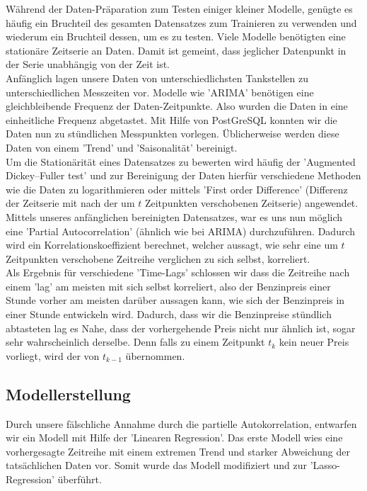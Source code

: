 \documentclass[
ngerman          %
,a4paper          %
,11pt
,pdftex
]{report}
\begin{document}
Während der Daten-Präparation zum Testen einiger kleiner Modelle, genügte es häufig ein Bruchteil des gesamten Datensatzes zum Trainieren zu verwenden und wiederum ein Bruchteil dessen, um es zu testen.
Viele Modelle benötigten eine stationäre Zeitserie an Daten.
Damit ist gemeint, dass jeglicher Datenpunkt in der Serie unabhängig von der Zeit ist.\\
Anfänglich lagen unsere Daten von unterschiedlichsten Tankstellen zu unterschiedlichen Messzeiten vor. Modelle wie 'ARIMA' benötigen eine gleichbleibende Frequenz der Daten-Zeitpunkte. Also wurden die Daten in eine einheitliche Frequenz abgetastet. Mit Hilfe von PostGreSQL konnten wir die Daten nun zu stündlichen Messpunkten vorlegen. 
Üblicherweise werden diese Daten von einem 'Trend' und 'Saisonalität' bereinigt.\\
Um die Stationärität eines Datensatzes zu bewerten wird häufig der 'Augmented Dickey–Fuller test' \cite{stationarity} und zur Bereinigung der Daten hierfür verschiedene Methoden wie die Daten zu logarithmieren oder mittels 'First order Difference' (Differenz der Zeitserie mit nach der um $t$ Zeitpunkten verschobenen Zeitserie) angewendet. 
Mittels unseres anfänglichen bereinigten Datensatzes, war es uns nun möglich eine 'Partial Autocorrelation'\cite{pacf} (ähnlich wie bei ARIMA) durchzuführen. Dadurch wird ein Korrelationskoeffizient berechnet, welcher aussagt, wie sehr eine um $t$ Zeitpunkten verschobene Zeitreihe verglichen zu sich selbst, korreliert.\\
Als Ergebnis für verschiedene 'Time-Lags' schlossen wir dass die Zeitreihe nach einem 'lag' am meisten mit sich selbst korreliert, also der Benzinpreis einer Stunde vorher am meisten darüber aussagen kann, wie sich der Benzinpreis in einer Stunde entwickeln wird.
Dadurch, dass wir die Benzinpreise stündlich abtasteten lag es Nahe, dass der vorhergehende Preis nicht nur ähnlich ist, sogar sehr wahrscheinlich derselbe. Denn falls zu einem Zeitpunkt $t_k$ kein neuer Preis vorliegt, wird der von $t_{k-1}$ übernommen.

\subsection{Modellerstellung}

Durch unsere fälschliche Annahme durch die partielle Autokorrelation, entwarfen wir ein Modell mit Hilfe der 'Linearen Regression'.
Das erste Modell wies eine vorhergesagte Zeitreihe mit einem extremen Trend und starker Abweichung der tatsächlichen Daten vor. Somit wurde das Modell modifiziert und zur 'Lasso-Regression' überführt.
\end{document}
